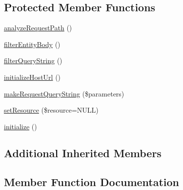 \subsection*{Protected Member Functions}
\begin{DoxyCompactItemize}
\item 
\hyperlink{class_able_polecat___message___request_abstract_a43f7e5e819f06b30b8b5c4f3830dcdf9}{analyze\+Request\+Path} ()
\item 
\hyperlink{class_able_polecat___message___request_abstract_a270b494c9f519f8e57e3242b18181703}{filter\+Entity\+Body} ()
\item 
\hyperlink{class_able_polecat___message___request_abstract_a47caae27fc361cff72e9eb53f59032e0}{filter\+Query\+String} ()
\item 
\hyperlink{class_able_polecat___message___request_abstract_a61811fe0b7325f59e02c3ceeabd58309}{initialize\+Host\+Url} ()
\item 
\hyperlink{class_able_polecat___message___request_abstract_a82910e6debe7f12fa5e10998ba7acf65}{make\+Request\+Query\+String} (\$parameters)
\item 
\hyperlink{class_able_polecat___message___request_abstract_a68d60b0c45c9bea3c9241f05369b0169}{set\+Resource} (\$resource=N\+U\+L\+L)
\item 
\hyperlink{class_able_polecat___message___request_abstract_a91098fa7d1917ce4833f284bbef12627}{initialize} ()
\end{DoxyCompactItemize}
\subsection*{Additional Inherited Members}


\subsection{Member Function Documentation}
\hypertarget{class_able_polecat___message___request_abstract_a43f7e5e819f06b30b8b5c4f3830dcdf9}{}
